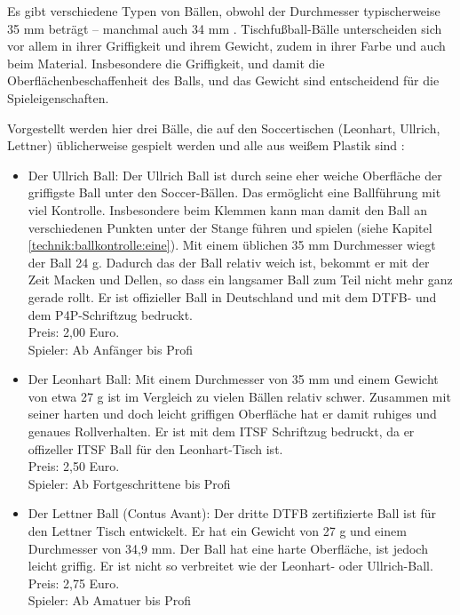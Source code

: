 Es gibt verschiedene Typen von Bällen, obwohl der Durchmesser typischerweise 35 mm beträgt -- manchmal auch 34 mm \citep{www:kickerbau:baelle}.
Tischfußball-Bälle unterscheiden sich vor allem in ihrer Griffigkeit und ihrem Gewicht, zudem in ihrer Farbe und auch beim Material.
Insbesondere die Griffigkeit, und damit die Oberflächenbeschaffenheit des Balls, und das Gewicht sind entscheidend für die Spieleigenschaften.  

Vorgestellt werden hier drei Bälle, die auf den Soccertischen (Leonhart, Ullrich, Lettner) üblicherweise gespielt werden und alle aus weißem Plastik sind \citep{www:tfc-reutlingen}:
\begin{itemize}
    \item Der Ullrich Ball:
        Der Ullrich Ball ist durch seine eher weiche Oberfläche der griffigste Ball unter den Soccer-Bällen. 
        Das ermöglicht eine Ballführung mit viel Kontrolle. Insbesondere beim Klemmen kann man damit den Ball an verschiedenen Punkten unter der Stange führen und spielen (siehe Kapitel \ref{technik:ballkontrolle:eine}).
        Mit einem üblichen 35 mm Durchmesser wiegt der Ball 24 g.
        Dadurch das der Ball relativ weich ist, bekommt er mit der Zeit Macken und Dellen, so dass ein langsamer Ball zum Teil nicht mehr ganz gerade rollt.
        Er ist offizieller Ball in Deutschland und mit dem DTFB- und dem P4P-Schriftzug bedruckt.
        \\
        Preis: 2,00 Euro. 
        \\
        Spieler: Ab Anfänger bis Profi
    \item Der Leonhart Ball: 
        Mit einem Durchmesser von 35 mm und einem Gewicht von etwa 27 g ist im Vergleich zu vielen Bällen relativ schwer. 
        Zusammen mit seiner harten und doch leicht griffigen Oberfläche hat er damit ruhiges und genaues Rollverhalten.
        Er ist mit dem ITSF Schriftzug bedruckt, da er offizeller ITSF Ball für den Leonhart-Tisch ist.
        \\
        Preis: 2,50 Euro. 
        \\
        Spieler: Ab Fortgeschrittene bis Profi
    \item Der Lettner Ball (Contus Avant):
        Der dritte DTFB zertifizierte Ball ist für den Lettner Tisch entwickelt.
        Er hat ein Gewicht von 27 g und einem Durchmesser von 34,9 mm.
        Der Ball hat eine harte Oberfläche, ist jedoch leicht griffig. 
        Er ist nicht so verbreitet wie der Leonhart- oder Ullrich-Ball. 
        \\
        Preis: 2,75 Euro.
        \\
        Spieler: Ab Amatuer bis Profi
\end{itemize}

